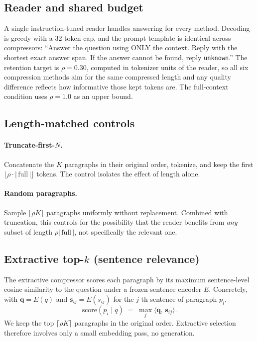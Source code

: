 \documentclass[10pt,twocolumn]{article}
\begin{document}
\subsection{Reader and shared budget}

A single instruction-tuned reader handles answering for every method. Decoding is greedy with a $32$-token cap, and the prompt template is identical across compressors: ``Answer the question using ONLY the context. Reply with the shortest exact answer span. If the answer cannot be found, reply \texttt{unknown}.'' The retention target is $\rho = 0.30$, computed in tokenizer units of the reader, so all six compression methods aim for the same compressed length and any quality difference reflects how informative those kept tokens are. The full-context condition uses $\rho = 1.0$ as an upper bound.

\subsection{Length-matched controls}

\paragraph{Truncate-first-$N$.} Concatenate the $K$ paragraphs in their original order, tokenize, and keep the first $\lfloor \rho \cdot |\,\text{full}\,| \rfloor$ tokens. The control isolates the effect of length alone.

\paragraph{Random paragraphs.} Sample $\lceil \rho K \rceil$ paragraphs uniformly without replacement. Combined with truncation, this controls for the possibility that the reader benefits from \emph{any} subset of length $\rho |\,\text{full}\,|$, not specifically the relevant one.

\subsection{Extractive top-$k$ (sentence relevance)}

The extractive compressor scores each paragraph by its maximum sentence-level cosine similarity to the question under a frozen sentence encoder $E$. Concretely, with $\mathbf{q} = E(q)$ and $\mathbf{s}_{ij} = E(s_{ij})$ for the $j$-th sentence of paragraph $p_i$,
\[
  \text{score}(p_i \mid q) \;=\; \max_j \langle \mathbf{q},\, \mathbf{s}_{ij} \rangle .
\]
We keep the top $\lceil \rho K \rceil$ paragraphs in the original order. Extractive selection therefore involves only a small embedding pass, no generation.
\end{document}
